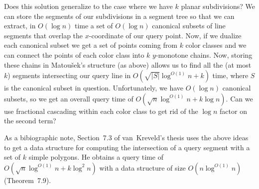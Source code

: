 \documentclass{article}
\newcommand{\polylog}{\log^{O(1)}}
\begin{document}
Does this solution generalize to the case where we have $k$ planar
subdivisions?  We can store the segments of our subdivisions in a
segment tree so that we can extract, in $O(\log n)$ time a set of
$O(\log n)$ canonical subsets of line segments that overlap the
$x$-coordinate of our query point.  Now, if we dualize each canonical
subset we get a set of points coming from $k$ color classes and we can
connect the points of each color class into $k$ $y$-monotone chains.
Now, storing these chains in Matou\v{s}ek's structure (as above)
allows us to find all the (at most $k$) segments intersecting our
query line in $O(\sqrt{|S|}\polylog n + k)$ time, where $S$ is the
canonical subset in question.  Unfortunately, we have $O(\log n)$
canonical subsets, so we get an overall query time of
$O(\sqrt{n}\polylog n + k\log n)$.  Can we use fractional cascading
within each color class to get rid of the $\log n$ factor on the
second term?

As a bibiographic note, Section~7.3 of van~Kreveld's thesis
\cite{vk92} uses the above ideas to get a data structure for computing
the intersection of a query segment with a set of $k$ simple polygons.
He obtains a query time of $O(\sqrt{n}\polylog n + k\log^2 n)$ with a
data structure of size $O(n\polylog n)$ (Theorem~7.9).




\end{document}
